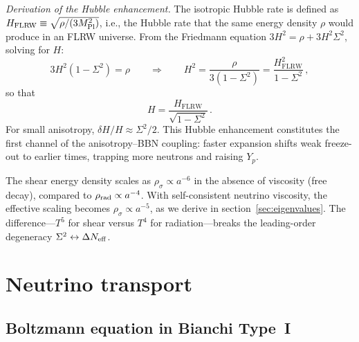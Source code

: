 \documentclass[a4paper,11pt]{article}
\newcommand{\Sig}{\Sigma}
\newcommand{\Yp}{Y_p}
\newcommand{\Neff}{N_{\rm eff}}
\newcommand{\FLRW}{\mathrm{FLRW}}
\begin{document}
\textit{Derivation of the Hubble enhancement.}  The isotropic Hubble rate is defined as $H_\FLRW \equiv \sqrt{\rho/(3M_{\rm Pl}^2)}$, i.e., the Hubble rate that the same energy density $\rho$ would produce in an FLRW universe.  From the Friedmann equation $3H^2 = \rho + 3H^2\Sig^2$, solving for $H$:
\begin{equation}
3H^2(1 - \Sig^2) = \rho \qquad\Longrightarrow\qquad H^2 = \frac{\rho}{3(1 - \Sig^2)} = \frac{H_\FLRW^2}{1 - \Sig^2}\,,
\end{equation}
so that
\begin{equation}
H = \frac{H_\FLRW}{\sqrt{1 - \Sig^2}}\,.\label{eq:hubble}
\end{equation}
For small anisotropy, $\delta H/H \approx \Sig^2/2$.  This Hubble enhancement constitutes the first channel of the anisotropy--BBN coupling: faster expansion shifts weak freeze-out to earlier times, trapping more neutrons and raising $\Yp$.

The shear energy density scales as $\rho_\sigma \propto a^{-6}$ in the absence of viscosity (free decay), compared to $\rho_{\rm rad} \propto a^{-4}$.  With self-consistent neutrino viscosity, the effective scaling becomes $\rho_\sigma \propto a^{-5}$, as we derive in section~\ref{sec:eigenvalues}.  The difference---$T^5$ for shear versus $T^4$ for radiation---breaks the leading-order degeneracy $\Sig^2 \leftrightarrow \Delta\Neff$.


\section{Neutrino transport}\label{sec:transport}

\subsection{Boltzmann equation in Bianchi Type~I}\label{sec:boltzmann_deriv}
\end{document}
